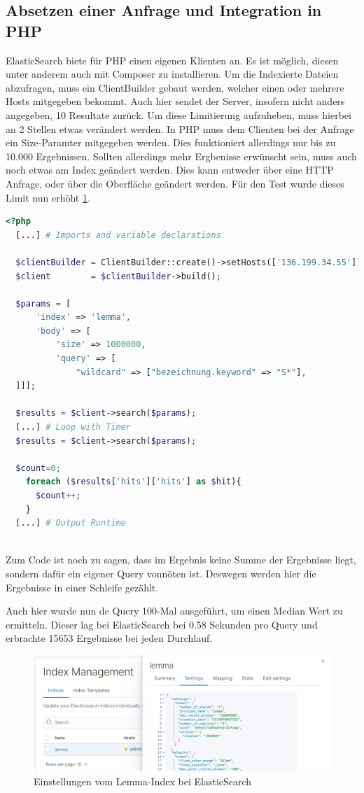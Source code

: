 \subsection{Absetzen einer Anfrage und Integration in PHP}

ElasticSearch biete für PHP einen eigenen Klienten an. Es ist möglich, diesen unter anderem auch mit Composer zu installieren. Um die Indexierte Dateien abzufragen, muss ein ClientBuilder gebaut werden, welcher einen oder mehrere Hosts mitgegeben bekommt. Auch hier sendet der Server, insofern nicht anders angegeben, 10 Resultate zurück. Um diese Limitierung aufzuheben, muss hierbei an 2 Stellen etwas verändert werden. In PHP muss dem Clienten bei der Anfrage ein Size-Paramter mitgegeben werden. Dies funktioniert allerdings nur bis zu 10.000 Ergebnissen. Sollten allerdings mehr Ergbenisse erwünscht sein, muss auch noch etwas am Index geändert werden. Dies kann entweder über eine HTTP Anfrage, oder über die Oberfläche geändert werden. Für den Test wurde dieses Limit nun erhöht \ref{img:elasticIndexSettings}. 


\begin{lstlisting}[language=php, frame=single, label={lst:managedSchema}, 
  morekeywords={type,uninvertible,indexed,stored,field,multiValued, name}] 
  <?php
  [...] # Imports and variable declarations

  $clientBuilder = ClientBuilder::create()->setHosts(['136.199.34.55']);
  $client        = $clientBuilder->build();

  $params = [
      'index' => 'lemma',
      'body' => [
          'size' => 1000000,
          'query' => [
              "wildcard" => ["bezeichnung.keyword" => "S*"],
  ]]];
  
  $results = $client->search($params);
  [...] # Loop with Timer  
  $results = $client->search($params);

  $count=0;
    foreach ($results['hits']['hits'] as $hit){
      $count++;
    }
  [...] # Output Runtime
  
\end{lstlisting}

Zum Code ist noch zu sagen, dass im Ergebnis keine Summe der Ergebnisse liegt, sondern dafür ein eigener Query vonnöten ist. Deswegen werden hier die Ergebnisse in einer Schleife gezählt.

Auch hier wurde nun de Query 100-Mal ausgeführt, um einen Median Wert zu ermitteln. Dieser lag bei ElasticSearch bei 0.58 Sekunden pro Query und erbrachte 15653 Ergebnisse bei jeden Durchlauf.

\begin{figure}
	\centering
	\includegraphics[width=1\linewidth]{images/elastic_index_settings.png}
	\caption{Einstellungen vom Lemma-Index bei ElasticSearch}
	\label{img:elasticIndexSettings}
\end{figure}


